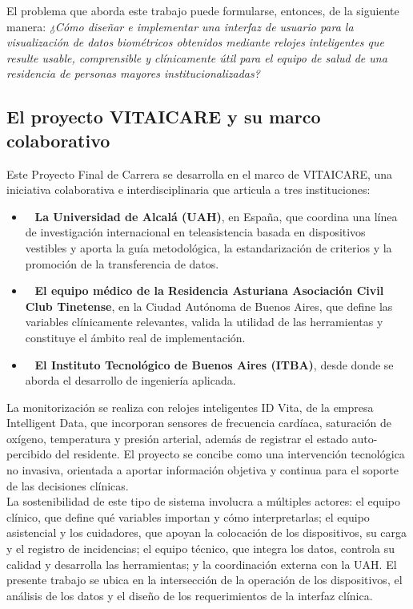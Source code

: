 El problema que aborda este trabajo puede formularse, entonces, de la siguiente manera: \textit{¿Cómo diseñar e implementar una interfaz de usuario para la visualización de datos biométricos obtenidos mediante relojes inteligentes que resulte usable, comprensible y clínicamente útil para el equipo de salud de una residencia de personas mayores institucionalizadas?}\\


\subsection{El proyecto VITAICARE y su marco colaborativo}
Este Proyecto Final de Carrera se desarrolla en el marco de VITAICARE, una iniciativa colaborativa e interdisciplinaria que articula a tres instituciones:\\


\begin{itemize}
\item~ \textbf{La Universidad de Alcalá (UAH)}, en España, que coordina una línea de investigación internacional en teleasistencia basada en dispositivos vestibles y aporta la guía metodológica, la estandarización de criterios y la promoción de la transferencia de datos.
\item~ \textbf{El equipo médico de la Residencia Asturiana Asociación Civil Club Tinetense}, en la Ciudad Autónoma de Buenos Aires, que define las variables clínicamente relevantes, valida la utilidad de las herramientas y constituye el ámbito real de implementación.
\item~ \textbf{El Instituto Tecnológico de Buenos Aires (ITBA)}, desde donde se aborda el desarrollo de ingeniería aplicada.
\end{itemize}
La monitorización se realiza con relojes inteligentes ID Vita, de la empresa Intelligent Data, que incorporan sensores de frecuencia cardíaca, saturación de oxígeno, temperatura y presión arterial, además de registrar el estado auto-percibido del residente. El proyecto se concibe como una intervención tecnológica no invasiva, orientada a aportar información objetiva y continua para el soporte de las decisiones clínicas.\\

La sostenibilidad de este tipo de sistema involucra a múltiples actores: el equipo clínico, que define qué variables importan y cómo interpretarlas; el equipo asistencial y los cuidadores, que apoyan la colocación de los dispositivos, su carga y el registro de incidencias; el equipo técnico, que integra los datos, controla su calidad y desarrolla las herramientas; y la coordinación externa con la UAH. El presente trabajo se ubica en la intersección de la operación de los dispositivos, el análisis de los datos y el diseño de los requerimientos de la interfaz clínica.\\


